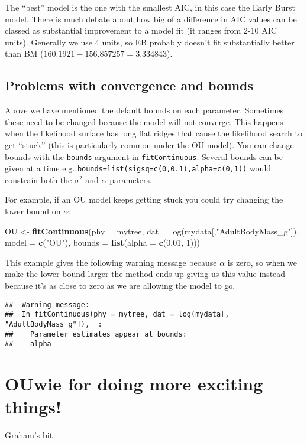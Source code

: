 \documentclass[11pt]{article}
\newcommand{\KeywordTok}[1]{\textcolor[rgb]{0.13,0.29,0.53}{\textbf{{#1}}}}
\newcommand{\DataTypeTok}[1]{\textcolor[rgb]{0.13,0.29,0.53}{{#1}}}
\newcommand{\DecValTok}[1]{\textcolor[rgb]{0.00,0.00,0.81}{{#1}}}
\newcommand{\CharTok}[1]{\textcolor[rgb]{0.31,0.60,0.02}{{#1}}}
\newcommand{\StringTok}[1]{\textcolor[rgb]{0.31,0.60,0.02}{{#1}}}
\newcommand{\NormalTok}[1]{{#1}}
\begin{document}
The ``best'' model is the one with the smallest AIC, in this case the Early Burst model. There is much debate about how big of a difference in AIC values can be classed as substantial improvement to a model fit (it ranges from 2-10 AIC units). Generally we use 4 units, so EB probably doesn't fit substantially better than BM ($160.1921 - 156.857257 = 3.334843$). 

\subsection{Problems with convergence and bounds}

Above we have mentioned the default bounds on each parameter. Sometimes these need to be changed because the model will not converge. This happens when the likelihood surface has long flat ridges that cause the likelihood search to get ``stuck'' (this is particularly common under the OU model). You can change bounds with the \texttt{bounds} argument in \texttt{fitContinuous}. Several bounds can be given at a time e.g. \texttt{bounds=list(sigsq=c(0,0.1),alpha=c(0,1))} would constrain both the $\sigma^2$ and $\alpha$ parameters.

For example, if an OU model keeps getting stuck you could try changing the lower bound on $\alpha$:

\begin{snugshade}
\begin{Highlighting}[]
\NormalTok{OU <-}\StringTok{ }\KeywordTok{fitContinuous}\NormalTok{(\DataTypeTok{phy = }mytree, \DataTypeTok{dat = }log(mydata[,"AdultBodyMass_g"]),} 
                    \DataTypeTok{model = }\KeywordTok{c}\NormalTok{(}\StringTok{"}\CharTok{OU}\StringTok{"}\NormalTok{), }\DataTypeTok{bounds = }\KeywordTok{list}\NormalTok{(}\DataTypeTok{alpha = }\KeywordTok{c}\NormalTok{(}\DecValTok{0.01}\NormalTok{, }\DecValTok{1}\NormalTok{)))}

\end{Highlighting}
\end{snugshade}

This example gives the following warning message because $\alpha$ is zero, so when we make the lower bound larger the method ends up giving us this value instead because it's as close to zero as we are allowing the model to go.

\begin{verbatim}
##  Warning message:
##  In fitContinuous(phy = mytree, dat = log(mydata[, "AdultBodyMass_g"]),  :
##    Parameter estimates appear at bounds:
##    alpha
\end{verbatim}

\section{OUwie for doing more exciting things!}

Graham's bit
\end{document}
